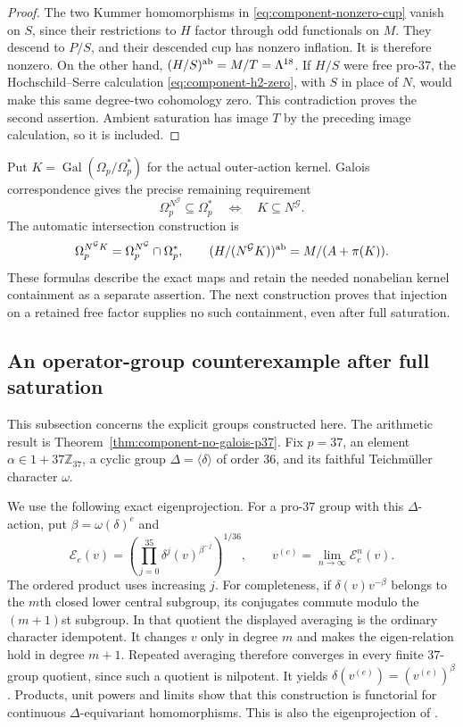 \documentclass[11pt]{article}
\theoremstyle{definition}\newtheorem{definition}[theorem]{Definition}
\begin{document}
\begin{proof}
The two Kummer homomorphisms in
\eqref{eq:component-nonzero-cup} vanish on $S$, since their
restrictions to $H$ factor through odd functionals on $M$.
They descend to $P/S$, and their descended cup has nonzero
inflation.  It is therefore nonzero.  On the other hand,
$(H/S)^{\rm ab}=M/T=\Lambda^{18}$.
If $H/S$ were free pro-$37$, the Hochschild--Serre calculation
\eqref{eq:component-h2-zero}, with $S$ in place of $N$, would
make this same degree-two cohomology zero.  This contradiction
proves the second assertion.  Ambient saturation has image
$T$ by the preceding image calculation, so it is included.
\end{proof}

Put $K=\operatorname{Gal}(\Omega_p/\Omega_p^*)$ for the actual
outer-action kernel.  Galois correspondence gives the precise
remaining requirement
\[
 \Omega_p^{N^{\mathcal G}}\subseteq\Omega_p^*
 \quad\Longleftrightarrow\quad K\subseteq N^{\mathcal G}.
\]
The automatic intersection construction is
\[
 \Omega_p^{N^{\mathcal G}K}
   =\Omega_p^{N^{\mathcal G}}\cap\Omega_p^*,
 \qquad
 (H/(N^{\mathcal G}K))^{\rm ab}
   =M/(A+\pi(K)).
\]
These formulas describe the exact maps and retain the needed
nonabelian kernel containment as a separate assertion.
The next construction proves that injection on a retained free
factor supplies no such containment, even after full saturation.

\subsection{An operator-group counterexample after full saturation}

This subsection concerns the explicit groups constructed here.
The arithmetic result is Theorem~\ref{thm:component-no-galois-p37}.
Fix $p=37$, an element $\alpha\in1+37\mathbb Z_{37}$, a
cyclic group $\Delta=\langle\delta\rangle$ of order $36$, and
its faithful Teichm\"uller character $\omega$.

We use the following exact eigenprojection.  For a pro-$37$ group
with this $\Delta$-action, put $\beta=\omega(\delta)^e$ and
\[
 \mathcal E_e(v)=
 \left(\prod_{j=0}^{35}\delta^j(v)^{\beta^{-j}}\right)^{1/36},
 \qquad
 v^{(e)}=\lim_{n\to\infty}\mathcal E_e^n(v).
\]
The ordered product uses increasing $j$.
For completeness, if $\delta(v)v^{-\beta}$ belongs to the
$m$th closed lower central subgroup, its conjugates commute
modulo the $(m+1)$st subgroup.  In that quotient the displayed
averaging is the ordinary character idempotent.  It changes $v$
only in degree $m$ and makes the eigen-relation hold in degree
$m+1$.  Repeated averaging therefore converges in every finite
$37$-group quotient, since such a quotient is nilpotent.
It yields $\delta(v^{(e)})=(v^{(e)})^\beta$.
Products, unit powers and limits show that this construction is
functorial for continuous $\Delta$-equivariant homomorphisms.
This is also the eigenprojection of
\cite[Lemma~4]{Sharifi}.
\end{document}
